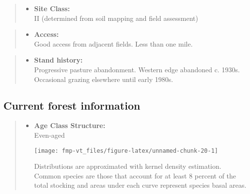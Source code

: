 \documentclass[]{tufte-handout}
\providecommand{\tightlist}{%
  \setlength{\itemsep}{0pt}\setlength{\parskip}{0pt}}
\begin{document}
\begin{quote}
\begin{itemize}
\tightlist
\item
  \textbf{Site Class:}\\
  \vspace{2pt} II (determined from soil mapping and field assessment)
\end{itemize}
\end{quote}

\begin{quote}
\begin{itemize}
\tightlist
\item
  \textbf{Access:}\\
  \vspace{2pt} Good access from adjacent fields. Less than one mile.
\end{itemize}
\end{quote}

\begin{quote}
\begin{itemize}
\tightlist
\item
  \textbf{Stand history:}\\
  \vspace{2pt} Progressive pasture abandonment. Western edge abandoned
  c. 1930s. Occasional grazing elsewhere until early 1980s.
\end{itemize}
\end{quote}

\subsection{Current forest
information}\label{current-forest-information-3}

\begin{quote}
\begin{itemize}
\tightlist
\item
  \textbf{Age Class Structure:}\\
  \vspace{2pt} Even-aged\\

  \begin{marginfigure}
  \texttt{[image: fmp-vt\_files/figure-latex/unnamed-chunk-20-1]} \caption[Distributions are approximated with kernel density estimation]{Distributions are approximated with kernel density estimation. Common species are those that account for at least 8 percent of the total stocking and areas under each curve represent species basal areas.}\label{fig:unnamed-chunk-20}
  \end{marginfigure}
\end{itemize}
\end{quote}
\end{document}
